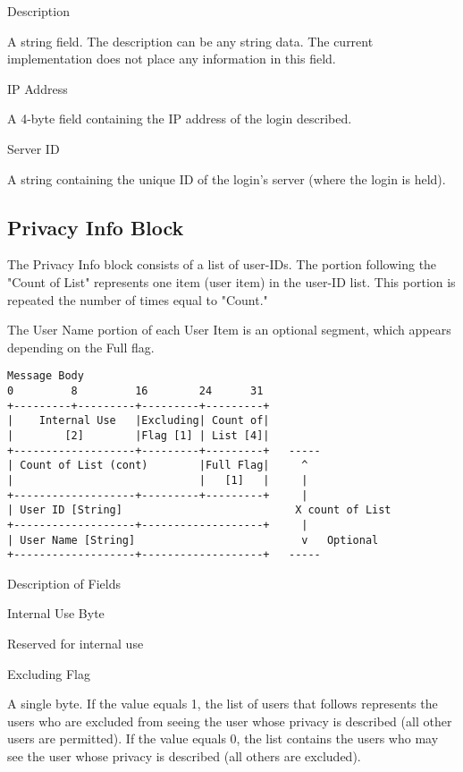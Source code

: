 \documentclass[titlepage,oneside]{book}
\begin{document}
\par{} Description
\par{}   A string field. The description can be any string data. The current
  implementation does not place any information in this field.

\par{} IP Address
\par{}   A 4-byte field containing the IP address of the login described.

\par{} Server ID
\par{}   A string containing the unique ID of the login's server
  (where the login is held).

\subsection{Privacy Info Block}

\par{} The Privacy Info block consists of a list of user-IDs. The
portion following the "Count of List" represents one item (user item)
in the user-ID list. This portion is repeated the number of times
equal to "Count."

\par{} The User Name portion of each User Item is an optional segment,
which appears depending on the Full flag.

\begin{verbatim}
Message Body
0         8         16        24      31
+---------+---------+---------+---------+
|    Internal Use   |Excluding| Count of|
|        [2]        |Flag [1] | List [4]|
+-------------------+---------+---------+   -----
| Count of List (cont)        |Full Flag|     ^
|                             |   [1]   |     |
+-------------------+---------+---------+     |
| User ID [String]                           X count of List
+-------------------+-------------------+     |
| User Name [String]                          v   Optional
+-------------------+-------------------+   -----
\end{verbatim}

\par{} Description of Fields

\par{} Internal Use Byte
\par{}   Reserved for internal use

\par{} Excluding Flag
\par{}   A single byte. If the value equals 1, the list of users that follows
  represents the users who are excluded from seeing the user whose
  privacy is described (all other users are permitted).
  If the value equals 0, the list contains the users who may see the
  user whose privacy is described (all others are excluded).
\end{document}
